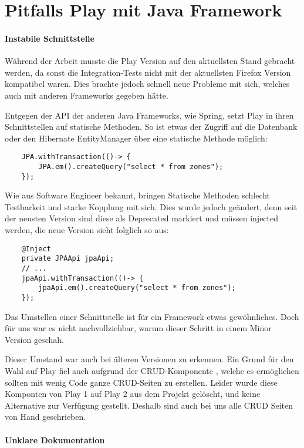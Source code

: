 \chapter{Pitfalls Play mit Java Framework}
\label{ch:play_pitfalls}

\subsubsection{Instabile Schnittstelle}
Während der Arbeit musste die Play Version auf den aktuellsten Stand gebracht werden, da sonst die Integration-Tests nicht mit der aktuellsten Firefox Version kompatibel waren. 
Dies brachte jedoch schnell neue Probleme mit sich, welches auch mit anderen Frameworks gegeben hätte.

Entgegen der API der anderen Java Frameworks, wie Spring, setzt Play in ihren Schnittstellen auf statische Methoden.
So ist etwas der Zugriff auf die Datenbank oder den Hibernate EntityManager über eine statische Methode möglich:
\begin{lstlisting}
    JPA.withTransaction(()-> {
        JPA.em().createQuery("select * from zones");
    });
\end{lstlisting}

Wie aus Software Engineer bekannt, bringen Statische Methoden schlecht Testbarkeit und starke Kopplung mit sich.
Dies wurde jedoch geändert, denn seit der neusten Version sind diese als Deprecated markiert und müssen injected werden, die neue Version sieht folglich so aus:
\begin{lstlisting}
    @Inject
    private JPAApi jpaApi;
    // ...
    jpaApi.withTransaction(()-> {
        jpaApi.em().createQuery("select * from zones");
    });
\end{lstlisting}

Das Umstellen einer Schnittstelle ist für ein Framework etwas gewöhnliches. Doch für uns war es nicht nachvollziehbar, warum dieser Schritt in einem Minor Version geschah.

Dieser Umstand war auch bei älteren Versionen zu erkennen. 
Ein Grund für den Wahl auf Play fiel auch aufgrund der CRUD-Komponente \cite{play-crud-1}, welche es ermöglichen sollten mit wenig Code ganze CRUD-Seiten zu erstellen.
Leider wurde diese Komponten von Play 1 auf Play 2 aus dem Projekt gelöscht, und keine Alternative zur Verfügung gestellt. 
Deshalb sind auch bei uns alle CRUD Seiten von Hand geschrieben.

\subsubsection{Unklare Dokumentation}

